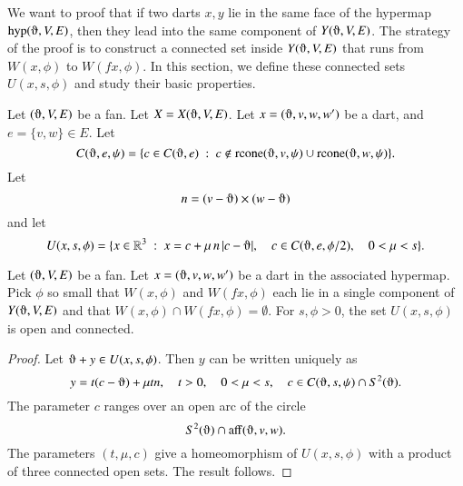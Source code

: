 
We want to proof that if two darts $x,y$ lie in the same
face of the hypermap $\op{hyp}(\orgn,V,E)$, then they lead
into the same component of $Y(\orgn,V,E)$.  The
strategy of the proof
is to construct a connected set inside $Y(\orgn,V,E)$
that runs from $W(x,\phi)$ to $W(f x,\phi)$.  
In this section, we define these connected sets $U(x,s,\phi)$
and study their basic properties.

Let $(\orgn,V,E)$ be a fan.  Let $X=X(\orgn,V,E)$. Let
$x=(\orgn,v,w,w')$ be a dart, and  $e = \{v,w\}\in E$.
Let 
  $$C(\orgn,e,\psi) =
    \{ c\in C(\orgn,e) \mid c\not\in \op{rcone}(\orgn,v,\psi)
    \cup\op{rcone}(\orgn,w,\psi)\}.
  $$
Let 
  $$n = (v-\orgn)\times (w-\orgn)$$
and let
  $$
  U(x,s,\phi) = \{ x  \in \ring{R}^3 \mid
     x = c + \mu\, n\, |c-\orgn|,\quad
     c\in C(\orgn,e,\phi/2),\quad
     0 < \mu < s
     \}.
  $$

\begin{lemma}  Let $(\orgn,V,E)$ be a fan.
Let $x=(\orgn,v,w,w')$ be a dart in the associated hypermap.
Pick $\phi$ so small that $W(x,\phi)$
and $W(f x,\phi)$ each lie in a single component 
of $Y(\orgn,V,E)$ and
that $W(x,\phi)\cap W(f x,\phi) =\emptyset$.
For $s,\phi > 0$, the set $U(x,s,\phi)$ is
open and connected.
\end{lemma}

\begin{proof}  Let $\orgn + y \in U(x,s,\phi)$.
Then $y$ can be written uniquely as
$$
  y = t (c - \orgn) + \mu t n,\quad
  t > 0,\quad
  0 < \mu < s,\quad
  c \in C(\orgn,s,\psi) \cap S^2(\orgn).
$$
The parameter $c$ ranges over an open arc of the circle
$$S^2(\orgn) \cap \op{aff}(\orgn,v,w).$$
The parameters $(t,\mu,c)$ give a homeomorphism of $U(x,s,\phi)$
with a product of three connected open sets.  The result follows.
\end{proof}


